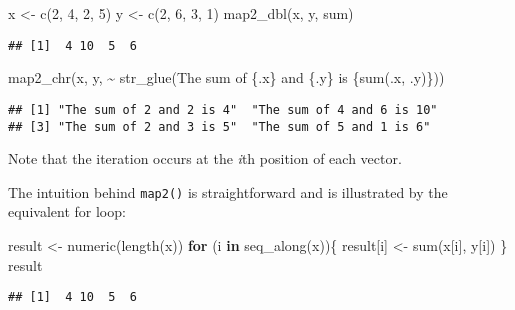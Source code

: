 \documentclass[
]{book}
\newenvironment{Shaded}{\begin{snugshade}}{\end{snugshade}}
\newcommand{\ControlFlowTok}[1]{\textcolor[rgb]{0.13,0.29,0.53}{\textbf{#1}}}
\newcommand{\DecValTok}[1]{\textcolor[rgb]{0.00,0.00,0.81}{#1}}
\newcommand{\FunctionTok}[1]{\textcolor[rgb]{0.00,0.00,0.00}{#1}}
\newcommand{\NormalTok}[1]{#1}
\newcommand{\OtherTok}[1]{\textcolor[rgb]{0.56,0.35,0.01}{#1}}
\newcommand{\SpecialCharTok}[1]{\textcolor[rgb]{0.00,0.00,0.00}{#1}}
\newcommand{\StringTok}[1]{\textcolor[rgb]{0.31,0.60,0.02}{#1}}
\begin{document}
\begin{Shaded}
\begin{Highlighting}[]
\NormalTok{x }\OtherTok{\textless{}{-}} \FunctionTok{c}\NormalTok{(}\DecValTok{2}\NormalTok{, }\DecValTok{4}\NormalTok{, }\DecValTok{2}\NormalTok{, }\DecValTok{5}\NormalTok{)}
\NormalTok{y }\OtherTok{\textless{}{-}} \FunctionTok{c}\NormalTok{(}\DecValTok{2}\NormalTok{, }\DecValTok{6}\NormalTok{, }\DecValTok{3}\NormalTok{, }\DecValTok{1}\NormalTok{)}
\FunctionTok{map2\_dbl}\NormalTok{(x, y, sum)}
\end{Highlighting}
\end{Shaded}

\begin{verbatim}
## [1]  4 10  5  6
\end{verbatim}

\begin{Shaded}
\begin{Highlighting}[]
\FunctionTok{map2\_chr}\NormalTok{(x, y, }\SpecialCharTok{\textasciitilde{}} \FunctionTok{str\_glue}\NormalTok{(}\StringTok{\textquotesingle{}The sum of \{.x\} and \{.y\} is \{sum(.x, .y)\}\textquotesingle{}}\NormalTok{))}
\end{Highlighting}
\end{Shaded}

\begin{verbatim}
## [1] "The sum of 2 and 2 is 4"  "The sum of 4 and 6 is 10"
## [3] "The sum of 2 and 3 is 5"  "The sum of 5 and 1 is 6"
\end{verbatim}

Note that the iteration occurs at the \emph{i}th position of each vector.

The intuition behind \texttt{map2()} is straightforward and is illustrated by the equivalent for loop:

\begin{Shaded}
\begin{Highlighting}[]
\NormalTok{result }\OtherTok{\textless{}{-}} \FunctionTok{numeric}\NormalTok{(}\FunctionTok{length}\NormalTok{(x))}
\ControlFlowTok{for}\NormalTok{ (i }\ControlFlowTok{in} \FunctionTok{seq\_along}\NormalTok{(x))\{}
\NormalTok{  result[i] }\OtherTok{\textless{}{-}} \FunctionTok{sum}\NormalTok{(x[i], y[i])}
\NormalTok{\}}
\NormalTok{result}
\end{Highlighting}
\end{Shaded}

\begin{verbatim}
## [1]  4 10  5  6
\end{verbatim}
\end{document}
